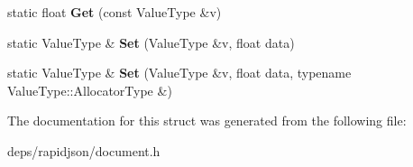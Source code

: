 \begin{DoxyCompactItemize}
\item 
static float {\bfseries Get} (const Value\+Type \&v)\hypertarget{structinternal_1_1_type_helper_3_01_value_type_00_01float_01_4_aa681e0d25878a7a770b0be82322b435a}{}\label{structinternal_1_1_type_helper_3_01_value_type_00_01float_01_4_aa681e0d25878a7a770b0be82322b435a}

\item 
static Value\+Type \& {\bfseries Set} (Value\+Type \&v, float data)\hypertarget{structinternal_1_1_type_helper_3_01_value_type_00_01float_01_4_a28318c2063421cf18dfa23d16352a3b8}{}\label{structinternal_1_1_type_helper_3_01_value_type_00_01float_01_4_a28318c2063421cf18dfa23d16352a3b8}

\item 
static Value\+Type \& {\bfseries Set} (Value\+Type \&v, float data, typename Value\+Type\+::\+Allocator\+Type \&)\hypertarget{structinternal_1_1_type_helper_3_01_value_type_00_01float_01_4_a3a0d8783f6228504058c427a16687bdf}{}\label{structinternal_1_1_type_helper_3_01_value_type_00_01float_01_4_a3a0d8783f6228504058c427a16687bdf}

\end{DoxyCompactItemize}


The documentation for this struct was generated from the following file\+:\begin{DoxyCompactItemize}
\item 
deps/rapidjson/document.\+h\end{DoxyCompactItemize}
